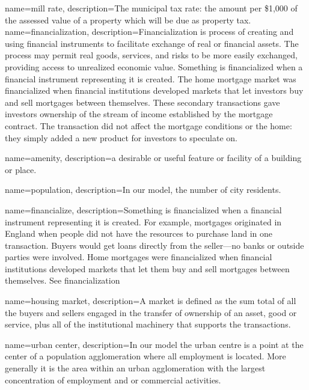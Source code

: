{
name=mill rate,
description={The municipal tax rate: the amount per \$1,000 of the assessed value of a property which will be due as property tax.}
}
{}
{
name=financialization,
description={Financialization is process of creating and using  \glspl{financial instrument} to facilitate exchange of real or financial assets.  The process may permit real goods, services, and risks to be more easily exchanged, providing access to unrealized economic value. Something is financialized when a financial instrument representing it is created. The home mortgage market was financialized when financial institutions developed markets that let investors buy and sell mortgages between themselves. These secondary transactions gave investors ownership of the stream of income established by the mortgage contract. The transaction did not affect the mortgage conditions or the home: they simply added a new product for investors to speculate on. }
}

{
name=amenity,
description={a desirable or useful feature or facility of a building or place.}
}

{
name=population,
description={In our model, the number of city residents. }
}

{
name=financialize,
description={Something is financialized when a financial instrument representing it is created. For example, mortgages originated in England when people did not have the resources to purchase land in one transaction. Buyers would get loans directly from the seller---no banks or outside parties were involved. Home mortgages were financialized when financial institutions developed markets that let them buy and sell mortgages between themselves.  See \gls{financialization}}
}

{
name=housing market,
description={A market is defined as the sum total of all the buyers and sellers engaged in the transfer of ownership of an asset, good or service, plus all of the institutional machinery that supports the transactions. }
}

{
name=urban center,
description={In our model the urban centre is a point at the center of a population \gls{agglomeration} where all employment is located. More generally it is the area within an urban \gls{agglomeration} with the largest concentration of employment and or commercial activities.} 
}

